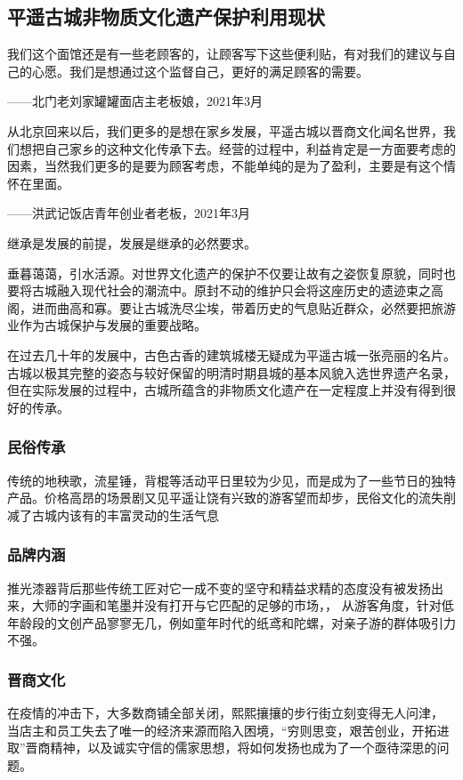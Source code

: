 \documentclass[UTF8]{ctexart}
\begin{document}
    \subsection{平遥古城非物质文化遗产保护利用现状}
我们这个面馆还是有一些老顾客的，让顾客写下这些便利贴，有对我们的建议与自己的心愿。我们是想通过这个监督自己，更好的满足顾客的需要。

\begin{flushright}
    ——北门老刘家罐罐面店主老板娘，2021年3月
\end{flushright}

从北京回来以后，我们更多的是想在家乡发展，平遥古城以晋商文化闻名世界，我们想把自己家乡的这种文化传承下去。经营的过程中，利益肯定是一方面要考虑的因素，当然我们更多的是要为顾客考虑，不能单纯的是为了盈利，主要是有这个情怀在里面。
\begin{flushright}
    ——洪武记饭店青年创业者老板，2021年3月
\end{flushright}
\hspace*{\fill}

继承是发展的前提，发展是继承的必然要求。

垂暮蔼蔼，引水活源。对世界文化遗产的保护不仅要让故有之姿恢复原貌，同时也要将古城融入现代社会的潮流中。原封不动的维护只会将这座历史的遗迹束之高阁，进而曲高和寡。要让古城洗尽尘埃，带着历史的气息贴近群众，必然要把旅游业作为古城保护与发展的重要战略。

在过去几十年的发展中，古色古香的建筑城楼无疑成为平遥古城一张亮丽的名片。古城以极其完整的姿态与较好保留的明清时期县城的基本风貌入选世界遗产名录，但在实际发展的过程中，古城所蕴含的非物质文化遗产在一定程度上并没有得到很好的传承。

        \subsubsection{民俗传承}
传统的地秧歌，流星锤，背棍等活动平日里较为少见，而是成为了一些节日的独特产品。价格高昂的场景剧又见平遥让饶有兴致的游客望而却步，民俗文化的流失削减了古城内该有的丰富灵动的生活气息
        \subsubsection{品牌内涵}
推光漆器背后那些传统工匠对它一成不变的坚守和精益求精的态度没有被发扬出来，大师的字画和笔墨并没有打开与它匹配的足够的市场，， 从游客角度，针对低年龄段的文创产品寥寥无几，例如童年时代的纸鸢和陀螺，对亲子游的群体吸引力不强。
        \subsubsection{晋商文化}
在疫情的冲击下，大多数商铺全部关闭，熙熙攘攘的步行街立刻变得无人问津， 当店主和员工失去了唯一的经济来源而陷入困境，“穷则思变，艰苦创业，开拓进取”晋商精神，以及诚实守信的儒家思想，将如何发扬也成为了一个亟待深思的问题。
\end{document}
